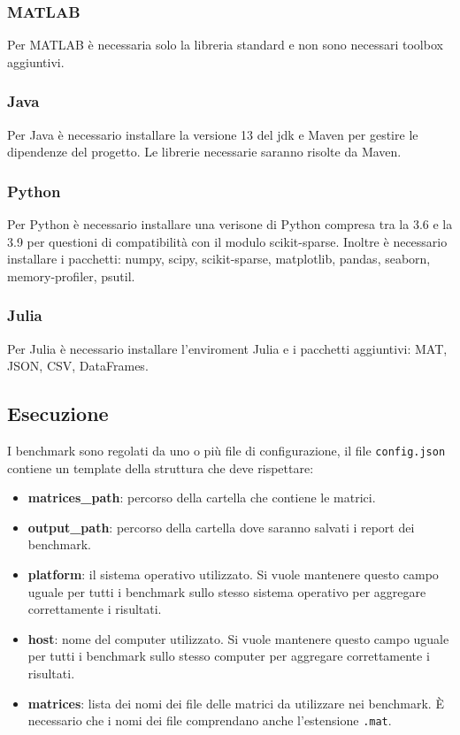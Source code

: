 \documentclass[a4paper, 12pt]{article}
\begin{document}
\subsubsection{MATLAB}
Per MATLAB è necessaria solo la libreria standard e non sono necessari toolbox
aggiuntivi.
\subsubsection{Java}
Per Java è necessario installare la versione 13 del jdk e Maven per gestire le
dipendenze del progetto. Le librerie necessarie saranno risolte da Maven.
\subsubsection{Python}
Per Python è necessario installare una verisone di Python compresa tra la 3.6 e
la 3.9 per questioni di compatibilità con il modulo scikit-sparse.
Inoltre è necessario installare i pacchetti: numpy, scipy, scikit-sparse,
matplotlib, pandas, seaborn, memory-profiler, psutil.
\subsubsection{Julia}
Per Julia è necessario installare l'enviroment Julia e i pacchetti aggiuntivi:
MAT, JSON, CSV, DataFrames.

\subsection{Esecuzione}
I benchmark sono regolati da uno o più file di configurazione, il file
\texttt{config.json} contiene un template della struttura che deve rispettare:
\begin{itemize}
  \item \textbf{matrices\_path}: percorso della cartella che contiene le
  matrici.
  \item \textbf{output\_path}: percorso della cartella dove saranno salvati i
  report dei benchmark.
  \item \textbf{platform}: il sistema operativo utilizzato.
  Si vuole mantenere questo campo uguale per tutti i benchmark sullo stesso
  sistema operativo per aggregare correttamente i risultati.
  \item \textbf{host}: nome del computer utilizzato.
  Si vuole mantenere questo campo uguale per tutti i benchmark sullo stesso
  computer per aggregare correttamente i risultati.
  \item \textbf{matrices}: lista dei nomi dei file delle matrici da utilizzare
  nei benchmark. \`E necessario che i nomi dei file comprendano anche
  l'estensione \texttt{.mat}.
\end{itemize}
\end{document}
